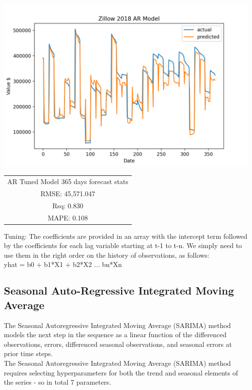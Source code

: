 \documentclass{article}
\begin{document}
	\includegraphics[scale = 0.2]{../plots/2018/zillow2018_AR-model.png}
	\begin{center}
    \begin{tabular}{ c }
     AR Tuned Model 365 days forecast stats \\ 
     RMSE: 45,571.047 \\  
     Rsq: 0.830 \\
     MAPE: 0.108 \\
    \end{tabular}
    \end{center}

    Tuning: The coefficients are provided in an array with the intercept term followed by the coefficients for each lag variable starting at t-1 to t-n. We simply need to use them in the right order on the history of observations, as follows: \\ yhat = b0 + b1*X1 + b2*X2 ... bn*Xn 

	\subsection{Seasonal Auto-Regressive Integrated Moving Average}
	The Seasonal Autoregressive Integrated Moving Average (SARIMA) method models the next step in the sequence as a linear function of the differenced observations, errors, differenced seasonal observations, and seasonal errors at prior time steps. \\
	
	The Seasonal Autoregressive Integrated Moving Average (SARIMA) method requires selecting hyperparameters for both the trend and seasonal elements of the series - so in total 7 parameters.\\
	
\end{document}
